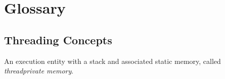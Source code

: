 %
%
%
%
%
%
%
%
%
%
%
%
%

\section{Glossary}
\label{sec:Glossary}
\subsection{Threading Concepts}
\label{subsec:Threading Concepts}
\glossarydefstart
An execution entity with a stack and associated static memory, called
\emph{threadprivate memory}.
\glossarydefend

